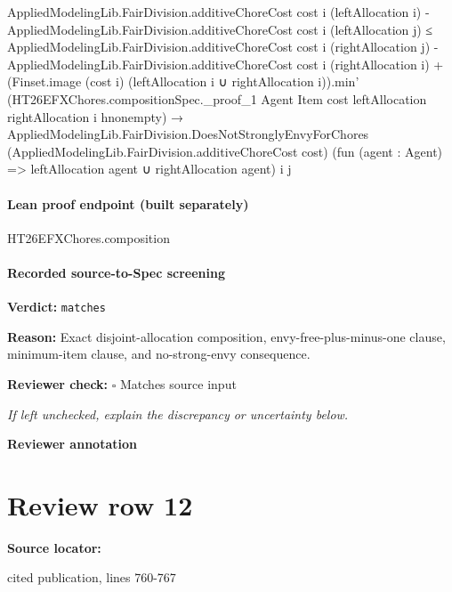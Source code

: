 \documentclass[10pt]{article}
\newcommand{\reviewerbox}{%
  \par\noindent\fbox{\parbox{0.96\linewidth}{\rule{0pt}{0.38in}}}\par
}
\newcommand{\reviewmatch}[1]{%
  \par\noindent\textbf{Reviewer check:} $\square$\; #1\par
  \noindent\emph{If left unchecked, explain the discrepancy or uncertainty below.}\par
}
\begin{document}
\begin{ReviewVerbatim}
                    AppliedModelingLib.FairDivision.additiveChoreCost cost i (leftAllocation i) -
                          AppliedModelingLib.FairDivision.additiveChoreCost cost i (leftAllocation j) ≤
                        AppliedModelingLib.FairDivision.additiveChoreCost cost i (rightAllocation j) -
                            AppliedModelingLib.FairDivision.additiveChoreCost cost i (rightAllocation i) +
                          (Finset.image (cost i) (leftAllocation i ∪ rightAllocation i)).min'
                            (HT26EFXChores.compositionSpec._proof_1 Agent Item cost leftAllocation rightAllocation i
                              hnonempty) →
                      AppliedModelingLib.FairDivision.DoesNotStronglyEnvyForChores
                        (AppliedModelingLib.FairDivision.additiveChoreCost cost)
                        (fun (agent : Agent) => leftAllocation agent ∪ rightAllocation agent) i j
\end{ReviewVerbatim}



\paragraph{Lean proof endpoint (built separately)}\begin{ReviewVerbatim}
HT26EFXChores.composition
\end{ReviewVerbatim}

\paragraph{Recorded source-to-Spec screening}
\textbf{Verdict:} \texttt{matches}
\\
{\raggedright
\textbf{Reason:} Exact disjoint-\allowbreak{}allocation composition, envy-\allowbreak{}free-\allowbreak{}plus-\allowbreak{}minus-\allowbreak{}one clause, minimum-\allowbreak{}item clause, and no-\allowbreak{}strong-\allowbreak{}envy consequence.\allowbreak{}
\par}
\reviewmatch{Matches source input}
\noindent\textbf{Reviewer annotation}\par
\reviewerbox
\clearpage
\hypertarget{source-claim-1b77c29da35b62c2}{}
\section*{Review row 12}
\textbf{Source locator:} {\footnotesize\raggedright cited publication, lines 760-\allowbreak{}767\par}
\end{document}

